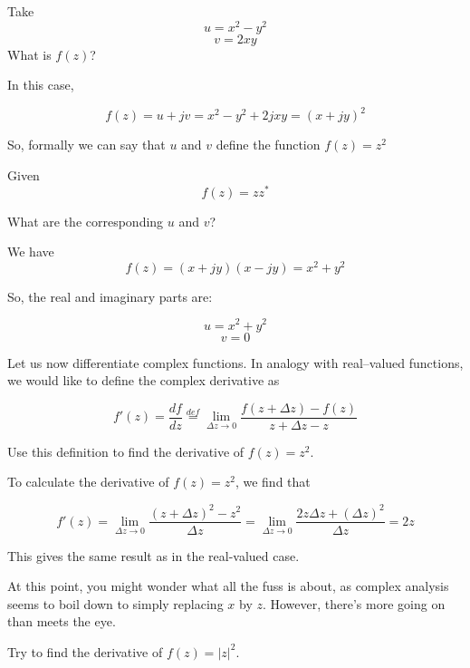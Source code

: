 \begin{cue}
Take
$$u = x^2 - y^2$$
$$v = 2 x y$$
What is $f(z)$?
\end{cue}

In this case,

$$f(z) = u + j v = x^2 - y^2 +2j x y = (x + jy)^2$$

So, formally we can say that $u$ and $v$ define the function $f(z) = z^2$

\begin{cue}
Given
$$f(z) = z z^* $$

What are the corresponding $u$ and $v$?
\end{cue}

We have 
$$f(z) = (x + jy)(x - jy) = x^2 + y^2$$

So, the real and imaginary parts are:

$$u = x^2 + y^2$$
$$v = 0$$


\pagebreak




Let us now differentiate complex functions. In analogy with real--valued functions, we would like to define the complex derivative as

\begin{equation}
f' (z)=\frac{df}{dz} \stackrel{def}{=} \lim_{\Delta z \to 0} \frac{f(z+\Delta z) - f(z)}{z+\Delta z - z} \label{eq-deriv}
\end{equation} 

\begin{cue}
Use this definition to find the derivative of $f(z)=z^2$.
\end{cue}

To calculate the derivative of  $f(z)=z^2$, we find that

$$f'(z)=\lim_{\Delta z \to 0} \frac{(z+\Delta z)^2 - z^2}{\Delta z} = \lim_{\Delta z \to 0} \frac{2 z \Delta z + (\Delta z)^2}{\Delta z}=2z $$

This gives the same result as in the real-valued case.

At this point, you might wonder what all the fuss is about, as complex analysis seems to boil down to simply replacing $x$ by $z$. However, there's more going on than meets the eye.

\begin{cue}
Try to find the derivative of $f(z)=|z|^2$.
\end{cue}

